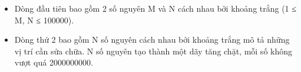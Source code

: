 \begin{itemize}
	\item     Dòng đầu tiên bao gồm 2 số nguyên M và N cách nhau bởi khoảng trắng (1 ≤ M, N ≤ 100000).   
	\item     Dòng thứ 2 bao gồm N số nguyên cách nhau bởi khoảng trắng mô tả những vị trí cần sửa chữa. N số nguyên tạo thành một dãy tăng chặt, mỗi số không vượt quá 2000000000.   
\end{itemize}

\